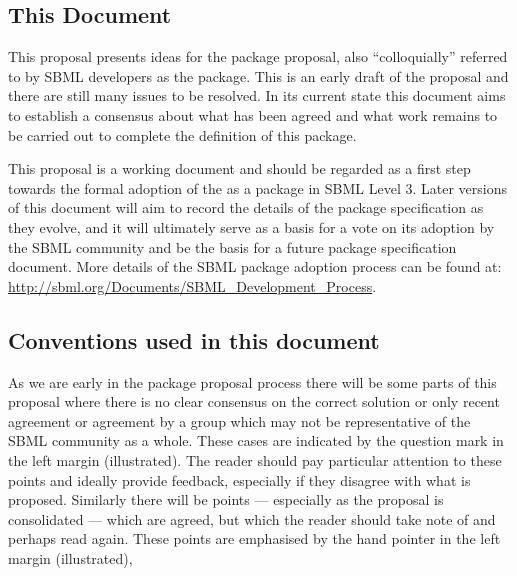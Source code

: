 \documentclass[draftspec]{sbmlpkgspec}
\begin{document}

\subsection{This Document}

This proposal presents ideas for the \distrib package proposal, also
``colloquially'' referred to by SBML developers as the \distribshort
package. This is an early draft of the proposal and there are still
many issues to be resolved. In its current state this document aims to
establish a consensus about what has been agreed and what work remains
to be carried out to complete the definition of this package.

This proposal is a working document and should be regarded as a first
step towards the formal adoption of the \distribshort as a package in
SBML Level 3. Later versions of this document will aim to record the
details of the package specification as they evolve, and it will
ultimately serve as a basis for a vote on its adoption by the SBML
community and be the basis for a future package specification
document. More details of the SBML package adoption process can be
found at: \url{http://sbml.org/Documents/SBML_Development_Process}.

\subsection{Conventions used in this document}

As we are early in the package proposal process there will be some
parts of this proposal where there is no clear consensus on the
correct solution or only recent agreement or agreement by a group
which may not be representative of the SBML community as a
whole. These cases are indicated by the \contraversial question mark
in the left margin (illustrated). The reader should pay particular attention to these
points and ideally provide feedback, especially if they disagree with
what is proposed. Similarly there will be points --- especially as the
proposal is consolidated --- which are agreed, but which the reader
should take note of and perhaps read again. These points \watchout are
emphasised by the hand pointer in the left margin (illustrated),
\end{document}
